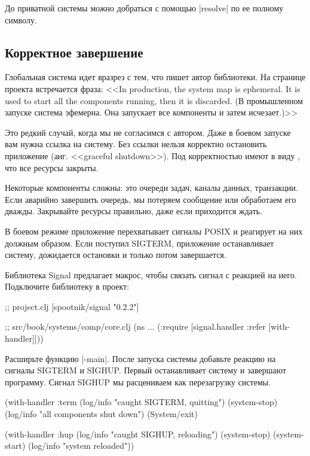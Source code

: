 До приватной системы можно добраться с помощью \spverb|resolve| по ее полному
символу.

\subsection{Корректное завершение}

Глобальная система идет вразрез с тем, что пишет автор библиотеки. На странице
проекта встречается фраза: <<In production, the system map is ephemeral. It is
used to start all the components running, then it is discarded. (В промышленном
запуске система эфемерна. Она запускает все компоненты и затем исчезает.)>>

Это редкий случай, когда мы не согласимся с автором. Даже в боевом запуске вам
нужна ссылка на систему. Без ссылки нельзя корректно остановить приложение
(анг. <<graceful shutdown>>). Под корректностью имеют в виду , что все ресурсы
закрыты.

Некоторые компоненты сложны: это очереди задач, каналы данных, транзакции. Если
аварийно завершить очередь, мы потеряем сообщение или обработаем его
дважды. Закрывайте ресурсы правильно, даже если приходится ждать.

В боевом режиме приложение перехватывает сигналы POSIX и реагирует на них
должным образом. Если поступил SIGTERM, приложение останавливает систему,
дожидается остановки и только потом завершается.

Библиотека Signal предлагает макрос,
чтобы связать сигнал с реакцией на него. Подключите библиотеку в проект:

\begin{english}
  \begin{clojure}
;; project.clj
[spootnik/signal "0.2.2"]

;; src/book/systems/comp/core.clj
(ns ...
  (:require [signal.handler :refer [with-handler]]))
  \end{clojure}
\end{english}

Расширьте функцию \spverb|-main|. После запуска системы добавьте реакцию на
сигналы SIGTERM и SIGHUP. Первый останавливает систему и завершают
программу. Сигнал SIGHUP мы расцениваем как перезагрузку системы.

\begin{english}
  \begin{clojure}
(with-handler :term
  (log/info "caught SIGTERM, quitting")
  (system-stop)
  (log/info "all components shut down")
  (System/exit)

(with-handler :hup
  (log/info "caught SIGHUP, reloading")
  (system-stop)
  (system-start)
  (log/info "system reloaded"))
  \end{clojure}
\end{english}

